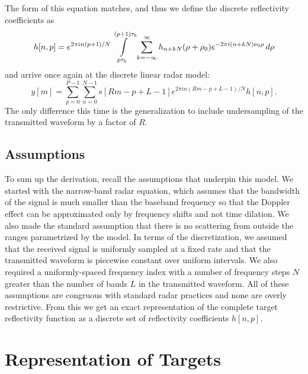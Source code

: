 The form of this equation matches, and thus we define the discrete reflectivity coefficients as
\begin{equation}\label{eq:reflectivity_coefficients_not_simplified}
 h[n,p] = e^{2 \pi i n(p+1)/N} \int\limits_{p\tau_b}^{(p+1)\tau_b} \sum_{k = -\infty}^{\infty} h_{n + kN}(\rho + \rho_0) e^{-2\pi i (n + kN) \nu_0 \rho} \,d\rho
\end{equation}
and arrive once again at the discrete linear radar model:
\begin{equation}\label{eq:radar_model_with_R}
 y[m] = \sum_{p=0}^{P-1} \sum_{n=0}^{N-1} s[Rm-p+L-1] e^{2 \pi i n(Rm-p+L-1)/N} h[n,p].
\end{equation}
The only difference this time is the generalization to include undersampling of the transmitted waveform by a factor of $R$.

\subsection{Assumptions}
To sum up the derivation, recall the assumptions that underpin this model. We started with the narrow-band radar equation, which assumes that the bandwidth of the signal is much smaller than the baseband frequency so that the Doppler effect can be approximated only by frequency shifts and not time dilation. We also made the standard assumption that there is no scattering from outside the ranges parametrized by the model. In terms of the discretization, we assumed that the received signal is uniformly sampled at a fixed rate and that the transmitted waveform is piecewise constant over uniform intervals. We also required a uniformly-spaced frequency index with a number of frequency steps $N$ greater than the number of bauds $L$ in the transmitted waveform. All of these assumptions are congruous with standard radar practices and none are overly restrictive. From this we get an exact representation of the complete target reflectivity function as a discrete set of reflectivity coefficients $h[n,p]$.

\section{Representation of Targets}
\label{radar_model_representation}
